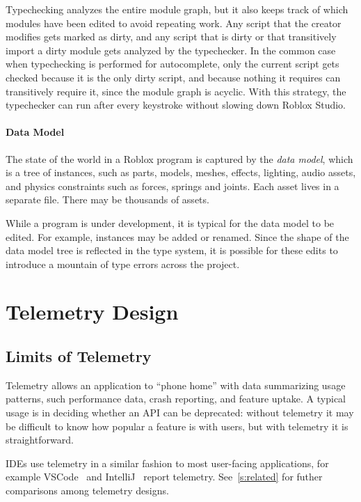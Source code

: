 \documentclass[english,submission,cleveref]{programming}
\begin{document}
Typechecking analyzes the entire module graph, but it also keeps track of which
modules have been edited to avoid repeating work.
Any script that the creator modifies gets marked as dirty,
and any script that is dirty or that transitively import a dirty
module gets analyzed by the typechecker.
In the common case when typechecking is performed for autocomplete,
only the current script gets checked because it is the only dirty
script, and because nothing it requires can transitively require it, since
the module graph is acyclic.
With this strategy, the typechecker can run after every keystroke without
slowing down Roblox Studio.


\paragraph{Data Model}

The state of the world in a {Roblox} program is captured by
the \emph{data model}, which is a tree of {instances}, such as
parts, models, meshes, effects, lighting, audio assets, and physics
constraints such as forces, springs and joints.
Each asset lives in a separate file.
There may be thousands of assets.

While a program is under development, it is typical for the data
model to be edited.
For example, instances may be added or renamed.
Since the shape of the data model tree is reflected in
the type system, it is possible for these edits to introduce a mountain
of type errors across the project.


\section{Telemetry Design}

\subsection{Limits of Telemetry}

Telemetry allows an application to ``phone home'' with data
summarizing usage patterns, such performance data, crash reporting,
and feature uptake. A typical usage is in deciding whether an API can
be deprecated: without telemetry it may be difficult to know how
popular a feature is with users, but with telemetry it is
straightforward.

IDEs use telemetry in a similar fashion to most user-facing
applications, for example VSCode~\cite{vsc-telemetry} and
IntelliJ~\cite{intellij-telemetry} report telemetry.
See~\cref{s:related} for futher comparisons among telemetry designs.
\end{document}
